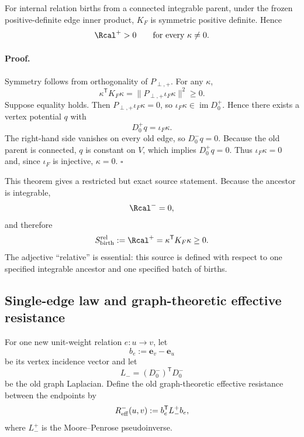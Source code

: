 \begin{theorem}
\label{thm:K-positive}
For internal relation births from a connected integrable parent, under the frozen positive-definite edge inner product, $K_F$ is symmetric positive definite. Hence
\begin{equation}
\Rcal^+>0
\qquad\text{for every }\kappa\neq0.
\end{equation}
\end{theorem}

\paragraph*{Proof.}
Symmetry follows from orthogonality of $P_{\perp,+}$. For any $\kappa$,
\begin{equation}
\kappa^{\mathsf T}K_F\kappa
=\|P_{\perp,+}\iota_F\kappa\|^2\ge0.
\end{equation}
Suppose equality holds. Then $P_{\perp,+}\iota_F\kappa=0$, so $\iota_F\kappa\in\operatorname{im}D_0^+$. Hence there exists a vertex potential $q$ with
\begin{equation}
D_0^+q=\iota_F\kappa.
\end{equation}
The right-hand side vanishes on every old edge, so $D_0^-q=0$. Because the old parent is connected, $q$ is constant on $V$, which implies $D_0^+q=0$. Thus $\iota_F\kappa=0$ and, since $\iota_F$ is injective, $\kappa=0$. \hfill$\square$

This theorem gives a restricted but exact source statement. Because the ancestor is integrable,
\begin{equation}
\Rcal^-=0,
\end{equation}
and therefore
\begin{equation}
S_{\rm birth}^{\rm rel}
:=\Rcal^+
=\kappa^{\mathsf T}K_F\kappa
\ge0.
\label{eq:restricted-birth-source}
\end{equation}
The adjective ``relative'' is essential: this source is defined with respect to one specified integrable ancestor and one specified batch of births.

\subsection{Single-edge law and graph-theoretic effective resistance}

For one new unit-weight relation $e:u\to v$, let
\begin{equation}
b_e:=\mathbf e_v-\mathbf e_u
\end{equation}
be its vertex incidence vector and let
\begin{equation}
L_-=(D_0^-)^{\mathsf T}D_0^-
\end{equation}
be the old graph Laplacian. Define the old graph-theoretic effective resistance between the endpoints by
\begin{equation}
R_{\rm eff}^-(u,v)
:=b_e^{\mathsf T}L_-^+b_e,
\label{eq:Reff-definition}
\end{equation}
where $L_-^+$ is the Moore--Penrose pseudoinverse.

